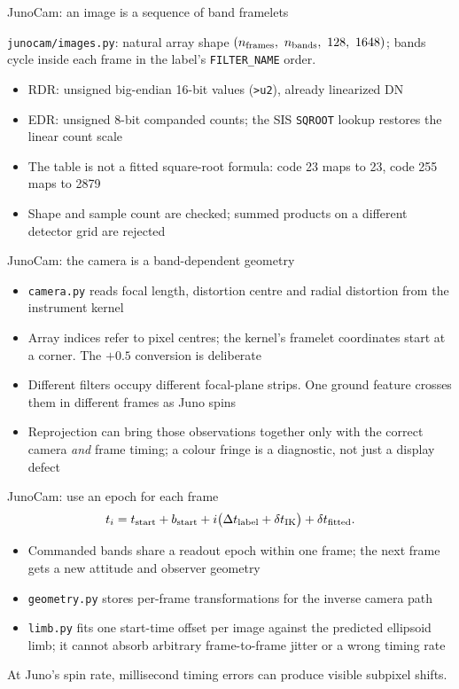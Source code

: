 \documentclass[aspectratio=169,11pt]{beamer}
\newcommand{\currevsec}{}
\newcommand{\revsec}[1]{\gdef\currevsec{#1}}
\begin{document}
\begin{frame}{JunoCam: an image is a sequence of band framelets}
  \revsec{4.18}
\begin{block}{\texttt{junocam/images.py}: natural array shape}
    $(n_{\rm frames},\ n_{\rm bands},\ 128,\ 1648)$; bands cycle inside each frame in the label's \texttt{FILTER\_NAME} order.
  \end{block}
  \begin{itemize}
    \item RDR: unsigned big-endian 16-bit values (\texttt{>u2}), already linearized DN
    \item EDR: unsigned 8-bit companded counts; the SIS \texttt{SQROOT} lookup restores the linear count scale
    \item The table is not a fitted square-root formula: code 23 maps to 23, code 255 maps to 2879
    \item Shape and sample count are checked; summed products on a different detector grid are rejected
  \end{itemize}
\end{frame}

\begin{frame}{JunoCam: the camera is a band-dependent geometry}
  \revsec{4.18}
\begin{itemize}
    \item \texttt{camera.py} reads focal length, distortion centre and radial distortion from the instrument kernel
    \item Array indices refer to pixel centres; the kernel's framelet coordinates start at a corner. The $+0.5$ conversion is deliberate
    \item Different filters occupy different focal-plane strips. One ground feature crosses them in different frames as Juno spins
    \item Reprojection can bring those observations together only with the correct camera \emph{and} frame timing; a colour fringe is a diagnostic, not just a display defect
  \end{itemize}
\end{frame}

\begin{frame}{JunoCam: use an epoch for each frame}
  \revsec{4.18}
\small
  \[
    t_i = t_{\rm start}+b_{\rm start}
          + i\bigl(\Delta t_{\rm label}+\delta t_{\rm IK}\bigr)
          + \delta t_{\rm fitted} .
  \]
  \normalsize
  \begin{itemize}
    \item Commanded bands share a readout epoch within one frame; the next frame gets a new attitude and observer geometry
    \item \texttt{geometry.py} stores per-frame transformations for the inverse camera path
    \item \texttt{limb.py} fits one start-time offset per image against the predicted ellipsoid limb; it cannot absorb arbitrary frame-to-frame jitter or a wrong timing rate
  \end{itemize}
  At Juno's spin rate, millisecond timing errors can produce visible subpixel shifts.
\end{frame}
\end{document}
